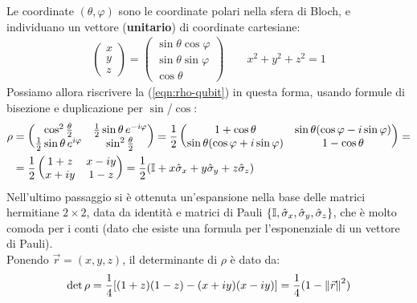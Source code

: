 \documentclass[../../InformazioneQuantistica.tex]{subfiles}
\begin{document}
Le coordinate $(\theta,\varphi)$ sono le coordinate polari nella sfera di Bloch, e individuano un vettore (\textbf{unitario}) di coordinate cartesiane:
\begin{align}
\begin{pmatrix} x\\y \\z\end{pmatrix} =
\begin{pmatrix} \sin\theta \cos\varphi\\
\sin\theta \sin\varphi\\
\cos\theta
\end{pmatrix}
\qquad x^2+y^2+z^2=1
\label{eqn:versore-coord}
\end{align}
Possiamo allora riscrivere la (\ref{eqn:rho-qubit}) in questa forma, usando formule di bisezione e duplicazione per $\sin$/$\cos$:
\begin{align}\nonumber
 \rho &=
\begin{pmatrix}
\cos^2\frac{\theta}{2} & \frac{1}{2}\sin\theta\,e^{-i\varphi}\\
\frac{1}{2}\sin\theta\, e^{i\varphi} & \sin^2\frac{\theta}{2}
\end{pmatrix} =
\frac{1}{2}
\begin{pmatrix}
1+\cos\theta & \sin\theta(\cos\varphi-i\sin\varphi)\\
\sin\theta(\cos\varphi + i\sin\varphi) & 1-\cos\theta
\end{pmatrix} =\\
&= \frac{1}{2} \begin{pmatrix}
1+z & x-iy\\
x+iy & 1-z
\end{pmatrix} = \frac{1}{2} (\mathbb{I} + x \hat{\sigma}_x + y \hat{\sigma}_y + z\hat{\sigma}_z)
\label{eqn:rho-matrix-cartesiana}
\end{align}
Nell'ultimo passaggio si è ottenuta un'espansione nella base delle matrici hermitiane $2\times 2$, data da identità e matrici di Pauli $\{\mathbb{I}, \hat{\sigma}_x, \hat{\sigma}_y, \hat{\sigma}_z\}$, che è molto comoda per i conti (dato che esiste una formula per l'esponenziale di un vettore di Pauli).\\

Ponendo $\vec{r}=(x,y,z)$, il determinante di $\rho$ è dato da: 
\begin{align}
\operatorname{det}\rho = \frac{1}{4}[(1+z)(1-z)-(x+iy)(x-iy)]= \frac{1}{4}(1-\left\lVert\vec{r}\right\rVert^2)
\label{eqn:det-rho}
\end{align}
\end{document}
